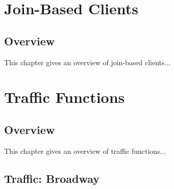 \nwenddocs{}\part{Join-Based Clients}
\label{part-join}

\chapter{Overview}
\label{join-overview}

This chapter gives an overview of join-based clients...

\nwenddocs{}\part{Traffic Functions}
\label{part-traffic}

\chapter{Overview}
\label{traffic-overview}

This chapter gives an overview of traffic functions...

\nwenddocs{}\chapter{Traffic: Broadway}

